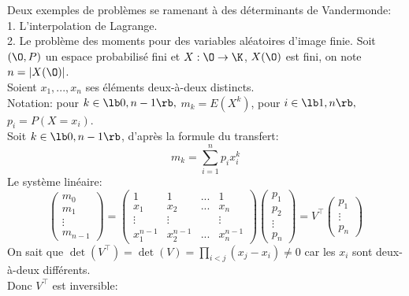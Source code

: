 \documentclass[11pt]{article}
\begin{document}
\pagebreak

\begin{ex}{}{}
    Deux exemples de problèmes se ramenant à des déterminants de Vandermonde:\\
    1. L'interpolation de Lagrange.\\
    2. Le problème des moments pour des variables aléatoires d'image finie.
    \tcblower
    Soit $(\O,P)$ un espace probabilisé fini et $X:\O\to\K$, $X(\O)$ est fini, on note $n=|X(\O)|$.\\
    Soient $x_1,...,x_n$ ses éléments deux-à-deux distincts.\\
    Notation: pour $k\in\lb0,n-1\rb,$ $m_k=E(X^k)$, pour $i\in\lb1,n\rb,$ $p_i=P(X=x_i)$.\\
    Soit $k\in\lb0,n-1\rb$, d'après la formule du transfert:
    \begin{equation*}
        m_k=\sum_{i=1}^np_ix_i^k
    \end{equation*}
    Le système linéaire:
    \begin{equation*}
        \begin{pmatrix}
            m_0\\
            m_1\\
            \vdots\\
            m_{n-1}
        \end{pmatrix}=\begin{pmatrix}
            1&1&...&1\\
            x_1&x_2&...&x_n\\
            \vdots&\vdots&&\vdots\\
            x_1^{n-1}&x_2^{n-1}&...&x_n^{n-1}
        \end{pmatrix}\begin{pmatrix}
            p_1\\
            p_2\\
            \vdots\\
            p_n
        \end{pmatrix}=V^{\top}\begin{pmatrix}
            p_1\\
            \vdots\\
            p_n
        \end{pmatrix}
    \end{equation*}
    On sait que $\det(V^{\top})=\det(V)=\prod_{i<j}(x_j-x_i)\neq0$ car les $x_i$ sont deux-à-deux différents.\\
    Donc $V^\top$ est inversible:
    \begin{equation*}

\end{equation*}
\end{ex}
\end{document}

